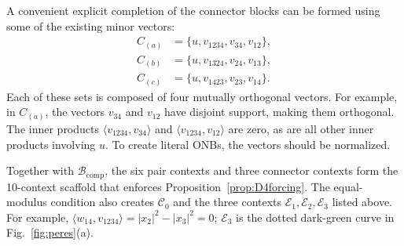 \documentclass[%
  reprint,
  superscriptaddress,
  showpacs,
  showkeys,
  amsmath,amssymb,
  pra,
  longbibliography,
  floatfix,
  x11names
]{revtex4-2}
\newcommand{\rev}[1]{{#1}}
\begin{document}
A convenient explicit completion of the connector blocks can be formed using some of the existing minor vectors:
\begin{align*}
C_{(a)}&=\{u, v_{1234}, v_{34}, v_{12}\},\\
C_{(b)}&=\{u, v_{1324}, v_{24}, v_{13}\},\\
C_{(c)}&=\{u, v_{1423}, v_{23}, v_{14}\}.
\end{align*}
Each of these sets is composed of four mutually orthogonal vectors. For example, in $C_{(a)}$, the vectors $v_{34}$ and $v_{12}$ have disjoint support,
making them orthogonal. The inner products $\langle v_{1234}, v_{34} \rangle$ and $\langle v_{1234}, v_{12} \rangle$ are zero, as are all other inner products involving $u$. To create literal ONBs, the vectors should be normalized.

\rev{Together with $\mathcal{B}_{\mathrm{comp}}$, the six pair contexts and three connector contexts form the 10-context scaffold that enforces Proposition~\ref{prop:D4forcing}.  The equal-modulus condition also creates $\mathcal{C}_0$ and the three contexts $\mathcal{E}_1,\mathcal{E}_2,\mathcal{E}_3$ listed above.  For example, $\langle w_{14},v_{1234}\rangle=|x_2|^2-|x_3|^2=0$; $\mathcal{E}_3$ is the dotted dark-green curve in Fig.~\ref{fig:peres}(a).}
\end{document}
